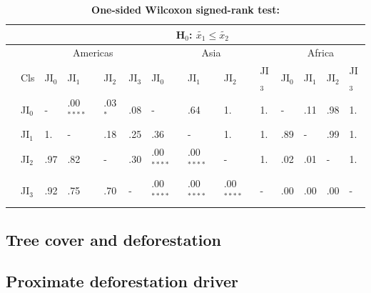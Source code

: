 			\begin{table}[ht]
				\centering
				\caption[One-sided Wilcoxon signed-rank test]{\textbf{One-sided Wilcoxon signed-rank test:}}
				\label{tab:wilcoxononesided}
				\begin{tabular}{llllllllllllll}
					\hline
					& & \multicolumn{12}{c}{H$_0$: $\tilde{x_1}\leq\tilde{x_2}$} \\\hline
					& & \multicolumn{4}{c}{Americas} & \multicolumn{4}{c}{Asia} & \multicolumn{4}{c}{Africa} \\
					& Cls & JI$_0$ & JI$_1$ & JI$_2$ & JI$_3$ & JI$_0$ & JI$_1$ & JI$_2$ & JI$_3$ & JI$_0$ & JI$_1$ & JI$_2$ & JI$_3$ \\\hline
					\multirow{4}{*}{\STAB{\rotatebox[origin=c]{90}{H$_0$: $\tilde{x_1}\geq\tilde{x_2}$}}} & JI$_0$ & - & .00$^{****}$ & .03$^{*}$ & .08 & - & .64 & 1. & 1. & - & .11 & .98 & 1. \\
					& JI$_1$ & 1. & - & .18 & .25 & .36 & - & 1. & 1. & .89 & - & .99 & 1. \\
					& JI$_2$ & .97 & .82 & - & .30 & .00$^{****}$ & .00$^{****}$ & - & 1. & .02 & .01 & - & 1. \\
					& JI$_3$ & .92 & .75 & .70 & - & .00$^{****}$ & .00$^{****}$ & .00$^{****}$ & - & .00 & .00 & .00 & - \\\hline
				\end{tabular}
			\end{table}

		\subsection{Tree cover and deforestation}
		\label{subsec:tree_cover_and_deforestation}

		\subsection{Proximate deforestation driver}
		\label{subsec:proxy_deforestation_driver}

